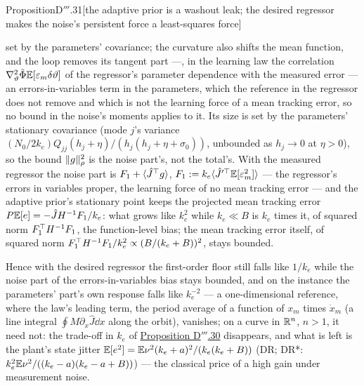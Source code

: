 \begin{thm}{Proposition}{D$'''$.31}[the adaptive prior is a washout leak; the desired regressor makes the noise's
persistent force a least-squares force]
\begin{enumerate}[label=\textup{(\roman*)}]
    set by the parameters' covariance; the curvature also shifts the mean function, and the loop removes its tangent
    part ---, in the learning law the correlation $\nabla^2_\vartheta\tilde\Phi\mathbb{E}[\varepsilon_m\delta\vartheta]$ of
    the regressor's parameter dependence with the measured error --- an errors-in-variables term in the parameters,
    which the reference in the regressor does not remove and which is not the learning force of a mean tracking
    error, so no bound in the noise's moments applies to it. Its size is set by the parameters' stationary covariance
    (mode $j$'s variance $(N_0/2k_e)Q_{jj}(h_j + \eta)/(h_j(h_j + \eta + \sigma_0))$, unbounded as $h_j\to0$ at
    $\eta > 0$), so the bound $\lVert g\rVert^2_\rho$ is the noise part's, not the total's. With the measured regressor the
    noise part is $F_1 + \langle\hat J^\top g\rangle$, $F_1 := k_e\langle\hat J'^\top\mathbb{E}[\varepsilon_m^2]\rangle$ --- the
    regressor's errors in variables proper, the learning force of no mean tracking error --- and the adaptive prior's
    stationary point keeps the projected mean tracking error $P\mathbb{E}[e] = -\hat JH^{-1}F_1/k_e$: what grows like $k_e^2$
    while $k_e\ll B$ is $k_e$ times it, of squared norm $F_1^\top H^{-1}F_1$, the function-level bias; the mean tracking
    error itself, of squared norm $F_1^\top H^{-1}F_1/k_e^2\propto(B/(k_e + B))^2$, stays bounded.
\end{enumerate}
Hence with the desired regressor the first-order floor still falls like $1/k_e$ while the noise part of the
errors-in-variables bias stays bounded, and on the instance the parameters' part's own response falls like $k_e^{-2}$
--- a one-dimensional reference, where the law's leading term, the period average of a function of $x_m$ times
$\dot x_m$ (a line integral $\oint M\partial_x\hat J\dd x$ along the orbit), vanishes; on a curve in $\mathbb{R}^n$, $n > 1$,
it need not: the trade-off in $k_e$ of \hyperref[res:thmDppp:30]{Proposition D$'''$.30} disappears, and what is left is
the plant's state jitter $\mathbb{E}[e^2] = \mathbb{E}\nu^2(k_e + a)^2/(k_e(k_e + B))$ (DR; DR*:
$k_e^2\mathbb{E}\nu^2/((k_e - a)(k_e - a + B))$) --- the classical price of a high gain under measurement noise.
\end{thm}

